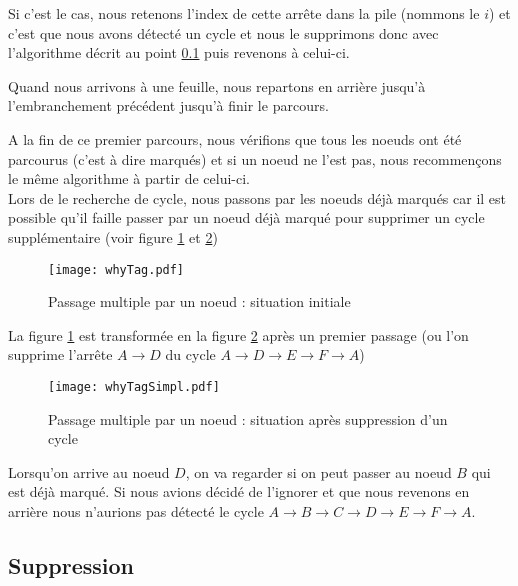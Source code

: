 \documentclass[12pt, oneside]{article}
\begin{document}
Si c'est le cas, nous retenons l'index de cette arrête dans la pile (nommons le $i$) et c'est que nous avons détecté un cycle et nous le supprimons donc avec l'algorithme décrit au point \ref{del} puis revenons à celui-ci.

Quand nous arrivons à une feuille, nous repartons en arrière jusqu'à l'embranchement précédent jusqu'à finir le parcours.

A la fin de ce premier parcours, nous vérifions que tous les noeuds ont été parcourus (c'est à dire marqués) et si un noeud ne l'est pas, nous recommençons le même algorithme à partir de celui-ci.\\

Lors de le recherche de cycle, nous passons par les noeuds déjà marqués car il est possible qu'il faille passer par un noeud déjà marqué pour supprimer un cycle supplémentaire (voir figure \ref{whyTag} et \ref{whyTagSimpl})


\begin{figure}[h]
   \caption{\label{whyTag} Passage multiple par un noeud : situation initiale}
   \begin{center}
   \texttt{[image: whyTag.pdf]}
   \end{center}
\end{figure}

La figure \ref{whyTag} est transformée en la figure \ref{whyTagSimpl} après un premier passage
(ou l'on supprime l'arrête $A \rightarrow D$ du cycle $A \rightarrow D \rightarrow E \rightarrow F \rightarrow A$)

\begin{figure}[h]
   \caption{\label{whyTagSimpl} Passage multiple par un noeud : situation après suppression d'un cycle}
   \begin{center}
   \texttt{[image: whyTagSimpl.pdf]}
   \end{center}
\end{figure}


Lorsqu'on arrive au noeud $D$, on va regarder si on peut passer au noeud $B$ qui est déjà marqué. Si nous avions décidé de l'ignorer et que nous revenons en arrière nous n'aurions pas détecté le cycle $A \rightarrow B \rightarrow C \rightarrow D \rightarrow E \rightarrow F \rightarrow A$.

\subsection{Suppression}
\label{del}
\end{document}
